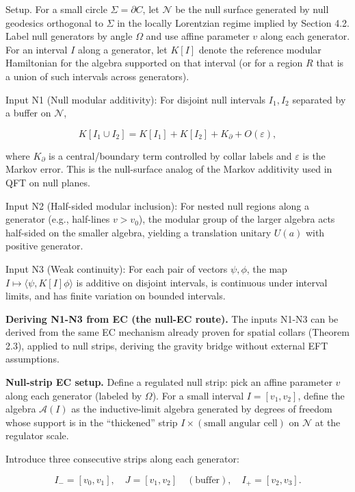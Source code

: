 \documentclass[11pt,a4paper]{article}
\theoremstyle{remark}
\begin{document}
Setup. For a small circle \(\Sigma = \partial C\), let \(\mathcal N\) be the null
surface generated by null geodesics orthogonal to \(\Sigma\) in the locally
Lorentzian regime implied by Section 4.2. Label null generators by angle
\(\Omega\) and use affine parameter \(v\) along each generator. For an interval
\(I\) along a generator, let \(K[I]\) denote the reference modular Hamiltonian for
the algebra supported on that interval (or for a region \(R\) that is a union of
such intervals across generators).

Input N1 (Null modular additivity): For disjoint null intervals \(I_1, I_2\)
separated by a buffer on \(\mathcal N\),

\[
K[I_1 \cup I_2] = K[I_1] + K[I_2] + K_{\partial} + O(\varepsilon),
\]

where \(K_{\partial}\) is a central/boundary term controlled by collar labels
and \(\varepsilon\) is the Markov error. This is the null-surface analog of the
Markov additivity used in QFT on null planes.

Input N2 (Half-sided modular inclusion): For nested null regions along a
generator (e.g., half-lines \(v > v_0\)), the modular group of the larger
algebra acts half-sided on the smaller algebra, yielding a translation
unitary \(U(a)\) with positive generator.

Input N3 (Weak continuity): For each pair of vectors \(\psi,\phi\), the map
\(I \mapsto \langle \psi, K[I] \phi \rangle\) is additive on disjoint intervals,
is continuous under interval limits, and has finite variation on bounded
intervals.

\textbf{Deriving N1-N3 from EC (the null-EC route).} The inputs N1-N3 can be
derived from the same EC mechanism already proven for spatial collars
(Theorem 2.3), applied to null strips, deriving the gravity bridge
without external EFT assumptions.

\textbf{Null-strip EC setup.} Define a regulated null strip: pick an affine
parameter \(v\) along each generator (labeled by \(\Omega\)). For a small interval
\(I = [v_1, v_2]\), define the algebra \(\mathcal{A}(I)\) as the inductive-limit
algebra generated by degrees of freedom whose support is in the ``thickened''
strip \(I \times (\text{small angular cell})\) on \(\mathcal{N}\) at the regulator
scale.

Introduce three consecutive strips along each generator:

\[
I_- = [v_0, v_1], \quad J = [v_1, v_2] \quad (\text{buffer}), \quad
I_+ = [v_2, v_3].
\]
\end{document}
